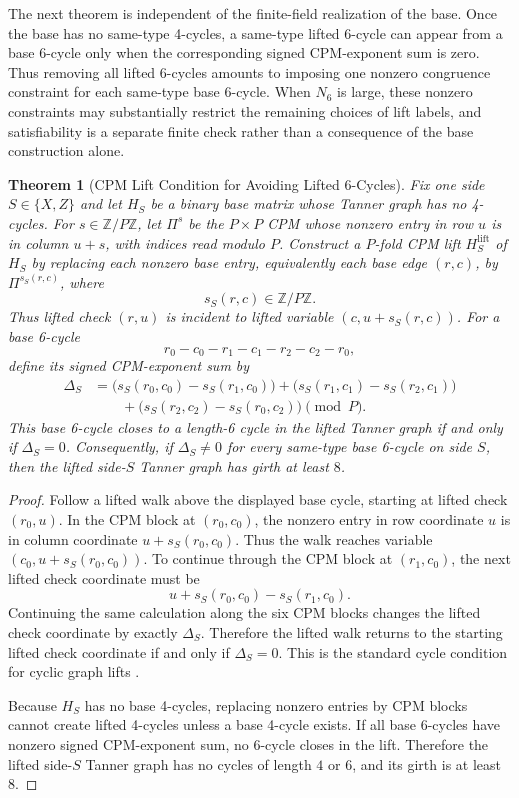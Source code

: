 \documentclass[11pt,a4paper]{article}
\theoremstyle{uprighttheorem}
\newtheorem{theorem}{Theorem}
\begin{document}
The next theorem is independent of the finite-field realization of the base.
Once the base has no same-type 4-cycles, a same-type lifted 6-cycle can appear from a base 6-cycle only when the corresponding signed CPM-exponent sum is zero.
Thus removing all lifted 6-cycles amounts to imposing one nonzero congruence constraint for each same-type base 6-cycle.
When \(N_6\) is large, these nonzero constraints may substantially restrict the remaining choices of lift labels, and satisfiability is a separate finite check rather than a consequence of the base construction alone.

\begin{theorem}[CPM Lift Condition for Avoiding Lifted 6-Cycles]\label{thm:cyclic-lift-six-cycle-criterion}
Fix one side \(S\in\{X,Z\}\) and let \(H_S\) be a binary base matrix whose Tanner graph has no 4-cycles.
For \(s\in\mathbb Z/P\mathbb Z\), let \(\Pi^s\) be the \(P\times P\) CPM whose nonzero entry in row \(u\) is in column \(u+s\), with indices read modulo \(P\).
Construct a \(P\)-fold CPM lift \(H_S^{\mathrm{lift}}\) of \(H_S\) by replacing each nonzero base entry, equivalently each base edge \((r,c)\), by \(\Pi^{s_S(r,c)}\), where
\[
  s_S(r,c)\in\mathbb Z/P\mathbb Z .
\]
Thus lifted check \((r,u)\) is incident to lifted variable \((c,u+s_S(r,c))\).
For a base 6-cycle
\[
  r_0-c_0-r_1-c_1-r_2-c_2-r_0,
\]
define its signed CPM-exponent sum by
\[
\begin{aligned}
  \Delta_S
  &=
  \bigl(s_S(r_0,c_0)-s_S(r_1,c_0)\bigr)
  +\bigl(s_S(r_1,c_1)-s_S(r_2,c_1)\bigr) \\
  &\qquad
  +\bigl(s_S(r_2,c_2)-s_S(r_0,c_2)\bigr)
  \pmod P .
\end{aligned}
\]
This base 6-cycle closes to a length-6 cycle in the lifted Tanner graph if and only if \(\Delta_S=0\).
Consequently, if \(\Delta_S\ne0\) for every same-type base 6-cycle on side \(S\), then the lifted side-\(S\) Tanner graph has girth at least \(8\).
\end{theorem}

\begin{proof}
Follow a lifted walk above the displayed base cycle, starting at lifted check \((r_0,u)\).
In the CPM block at \((r_0,c_0)\), the nonzero entry in row coordinate \(u\) is in column coordinate \(u+s_S(r_0,c_0)\).
Thus the walk reaches variable \((c_0,u+s_S(r_0,c_0))\).
To continue through the CPM block at \((r_1,c_0)\), the next lifted check coordinate must be
\[
  u+s_S(r_0,c_0)-s_S(r_1,c_0).
\]
Continuing the same calculation along the six CPM blocks changes the lifted check coordinate by exactly \(\Delta_S\).
Therefore the lifted walk returns to the starting lifted check coordinate if and only if \(\Delta_S=0\).
This is the standard cycle condition for cyclic graph lifts \cite{kelley2008ldpc}.

Because \(H_S\) has no base 4-cycles, replacing nonzero entries by CPM blocks cannot create lifted 4-cycles unless a base 4-cycle exists.
If all base 6-cycles have nonzero signed CPM-exponent sum, no 6-cycle closes in the lift.
Therefore the lifted side-\(S\) Tanner graph has no cycles of length \(4\) or \(6\), and its girth is at least \(8\).
\end{proof}
\end{document}

